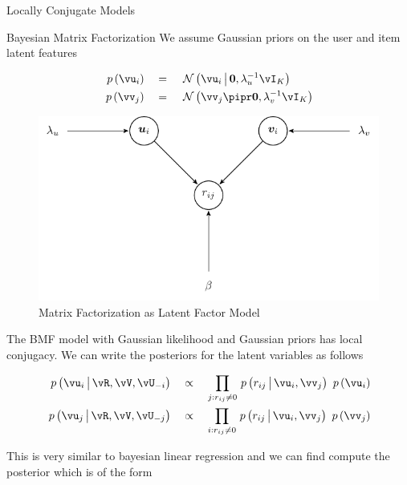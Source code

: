 \documentclass{article}
\begin{document}
\begin{ssection}{Locally Conjugate Models}
\begin{ssubsection}{Bayesian Matrix Factorization}
		We assume Gaussian priors on the user and item latent features

		\begin{align*}
			\prob{\vu_i}	&\eq \ND{\vu_i \pipe \vzero, \lambda_u^{-1} \iden{K}} \\
			\prob{\vv_j}	&\eq \ND{\vv_j \pipr \vzero, \lambda_v^{-1} \iden{K}}
		\end{align*} \br%

		\begin{figure}[h!]
			\centering
			\includegraphics{includes/sampling-methods/matrix-factorization.pdf}
			\caption{Matrix Factorization as Latent Factor Model}
		\end{figure}

		The BMF model with Gaussian likelihood and Gaussian priors has local conjugacy. We can write the posteriors for the latent variables as follows

		\begin{align*}
			\prob{\vu_i \pipe \vR, \vV, \vU_{-i}}	&\qprop \prod_{j : r_{ij} \ne 0} \prob{r_{ij} \pipe \vu_i, \vv_j} \, \prob{\vu_i} \\
			\prob{\vu_j \pipe \vR, \vV, \vU_{-j}}	&\qprop \prod_{i : r_{ij} \ne 0} \prob{r_{ij} \pipe \vu_i, \vv_j} \, \prob{\vv_j}
		\end{align*} \br%

		This is very similar to bayesian linear regression and we can find compute the posterior which is of the form


\end{ssubsection}
\end{ssection}
\end{document}
